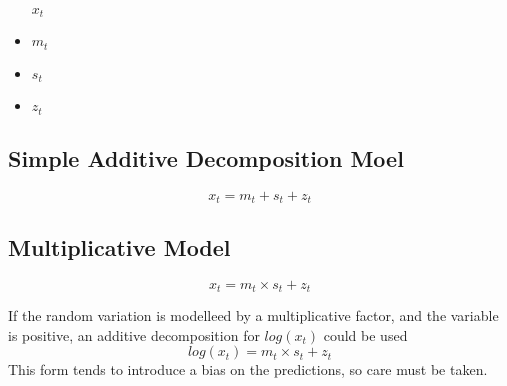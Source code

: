 

\begin{itemize}
\itme $x_t$
\item $m_t$
\item $s_t$
\item $z_t$
\end{itemize}
\subsection{Simple Additive Decomposition Moel}
\[ x_t = m_t + s_t +z_t \]


\subsection{Multiplicative Model}
\[ x_t = m_t \times s_t +z_t \]


If the random variation is modelleed by a multiplicative factor, and the variable is positive, an additive decomposition for $log(x_t)$
could be used
\[ log(x_t) = m_t \times s_t +z_t \]
This form tends to introduce a bias on the predictions, so care must be taken.
